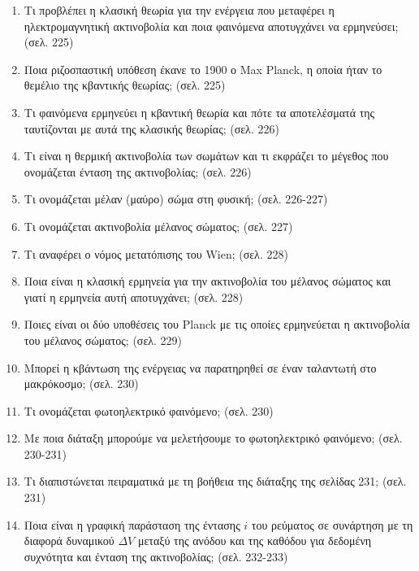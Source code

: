 \documentclass{article}
\begin{document}
\begin{enumerate}
      \item Τι προβλέπει η κλασική θεωρία για την ενέργεια που μεταφέρει η ηλεκτρομαγνητική ακτινοβολία και ποια φαινόμενα αποτυγχάνει να ερμηνεύσει; (σελ. 225)

      \item Ποια ριζοσπαστική υπόθεση έκανε το 1900 ο Max Planck, η οποία ήταν το θεμέλιο της κβαντικής θεωρίας; (σελ. 225)

      \item Τι φαινόμενα ερμηνεύει η κβαντική θεωρία και πότε τα αποτελέσματά της ταυτίζονται με αυτά της κλασικής θεωρίας; (σελ. 226)

      \item Τι είναι η θερμική ακτινοβολία των σωμάτων και τι εκφράζει το μέγεθος που ονομάζεται ένταση της ακτινοβολίας; (σελ. 226)

      \item Τι ονομάζεται μέλαν (μαύρο) σώμα στη φυσική; (σελ. 226-227)

      \item Τι ονομάζεται ακτινοβολία μέλανος σώματος; (σελ. 227)

      \item Τι αναφέρει ο νόμος μετατόπισης του Wien; (σελ. 228)

      \item Ποια είναι η κλασική ερμηνεία για την ακτινοβολία του μέλανος σώματος και γιατί η ερμηνεία αυτή αποτυγχάνει; (σελ. 228)

      \item Ποιες είναι οι δύο υποθέσεις του Planck με τις οποίες ερμηνεύεται η ακτινοβολία του μέλανος σώματος; (σελ. 229)

      \item Μπορεί η κβάντωση της ενέργειας να παρατηρηθεί σε έναν ταλαντωτή στο μακρόκοσμο; (σελ. 230)

      \item Τι ονομάζεται φωτοηλεκτρικό φαινόμενο; (σελ. 230)

      \item Με ποια διάταξη μπορούμε να μελετήσουμε το φωτοηλεκτρικό φαινόμενο; (σελ. 230-231)

      \item Τι διαπιστώνεται πειραματικά με τη βοήθεια της διάταξης της σελίδας 231; (σελ. 231)

      \item Ποια είναι η γραφική παράσταση της έντασης $i$ του ρεύματος σε συνάρτηση με τη διαφορά δυναμικού $\Delta V$ μεταξύ της ανόδου και της καθόδου για δεδομένη συχνότητα και ένταση της ακτινοβολίας; (σελ. 232-233)


\end{enumerate}
\end{document}
